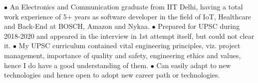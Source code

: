\documentclass[9pt]{developercv} %
\begin{document}
\vspace{0.5cm}



\begin{minipage}[t]{0.6\textwidth} %
	\vspace{-\baselineskip} %
	
	 $\bullet$ An Electronics and Communication graduate from IIT Delhi, having a total work experience of 5+ years as software developer in the field of IoT, Healthcare and Back-End at BOSCH, Amazon and Nykaa. $\bullet$ Prepared for UPSC during 2018-2020 and appeared in the interview in 1st attempt itself, but could not clear it. $\bullet$ My UPSC curriculum contained vital engineering principles, viz. project management, importance of quality and safety, engineering ethics and values, hence I do have a good understanding of them. $\bullet$ Can easily adapt to new technologies and hence open to adopt new career path or technologies.\\ %
\end{minipage}
\hfill %
\begin{minipage}[t]{0.35\textwidth} %
	\vspace{-\baselineskip} %
	\begin{barchart}{4} %
	\end{barchart}
\end{minipage}



\end{document}
